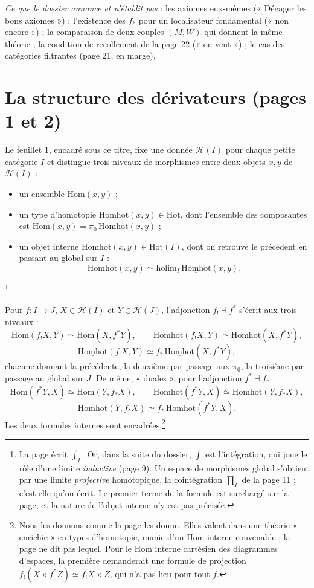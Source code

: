 \documentclass[11pt,a4paper]{article}
\begin{document}
\emph{Ce que le dossier annonce et n'établit pas} : les axiomes eux-mêmes
(« Dégager les bons axiomes ») ; l'existence des $f_{*}$ pour un
localisateur fondamental (« non encore ») ; la comparaison de deux couples
$(M, W)$ qui donnent la même théorie ; la condition de recollement de la
page 22 (« on veut ») ; le cas des catégories filtrantes (page 21, en marge).

\section*{La structure des dérivateurs (pages 1 et 2)}

Le feuillet 1, encadré sous ce titre, fixe une donnée $\mathcal H(I)$ pour
chaque petite catégorie $I$ et distingue trois niveaux de morphismes entre
deux objets $x, y$ de $\mathcal H(I)$ :
\begin{itemize}
  \item un ensemble $\mathrm{Hom}(x, y)$ ;
  \item un type d'homotopie $\mathrm{Homhot}(x, y) \in \mathrm{Hot}$, dont
  l'ensemble des composantes est $\mathrm{Hom}(x, y) = \pi_0\,
  \mathrm{Homhot}(x, y)$ ;
  \item un objet interne $\underline{\mathrm{Homhot}}(x, y) \in
  \mathrm{Hot}(I)$, dont on retrouve le précédent en passant au global sur
  $I$ :
  \[
    \mathrm{Homhot}(x, y) \simeq \mathrm{holim}_I\,
    \underline{\mathrm{Homhot}}(x, y).
  \]
\end{itemize}
\footnote{La page écrit $\int_I$. Or, dans la suite du dossier, $\int$ est
l'intégration, qui joue le rôle d'une limite \emph{inductive} (page 9). Un
espace de morphismes global s'obtient par une limite \emph{projective}
homotopique, la cointégration $\prod_I$ de la page 11 ; c'est elle qu'on
écrit. Le premier terme de la formule est surchargé sur la page, et la
nature de l'objet interne n'y est pas précisée.}

Pour $f : I \to J$, $X \in \mathcal H(I)$ et $Y \in \mathcal H(J)$,
l'adjonction $f_{!} \dashv f^{*}$ s'écrit aux trois niveaux :
\[
  \mathrm{Hom}(f_{!}X, Y) \simeq \mathrm{Hom}(X, f^{*}Y), \qquad
  \mathrm{Homhot}(f_{!}X, Y) \simeq \mathrm{Homhot}(X, f^{*}Y),
\]
\[
  \underline{\mathrm{Homhot}}(f_{!}X, Y) \simeq f_{*}\,
  \underline{\mathrm{Homhot}}(X, f^{*}Y),
\]
chacune donnant la précédente, la deuxième par passage aux $\pi_0$, la
troisième par passage au global sur $J$. De même, « duales », pour
l'adjonction $f^{*} \dashv f_{*}$ :
\[
  \mathrm{Hom}(f^{*}Y, X) \simeq \mathrm{Hom}(Y, f_{*}X), \qquad
  \mathrm{Homhot}(f^{*}Y, X) \simeq \mathrm{Homhot}(Y, f_{*}X),
\]
\[
  \underline{\mathrm{Homhot}}(Y, f_{*}X) \simeq f_{*}\,
  \underline{\mathrm{Homhot}}(f^{*}Y, X).
\]
Les deux formules internes sont encadrées.\footnote{Nous les donnons comme la
page les donne. Elles valent dans une théorie « enrichie » en types
d'homotopie, munie d'un $\mathrm{Hom}$ interne convenable ; la page ne dit pas
lequel. Pour le $\mathrm{Hom}$ interne cartésien des diagrammes d'espaces, la
première demanderait une formule de projection $f_{!}(X \times f^{*}Z)
\simeq f_{!}X \times Z$, qui n'a pas lieu pour tout $f$.}
\end{document}
